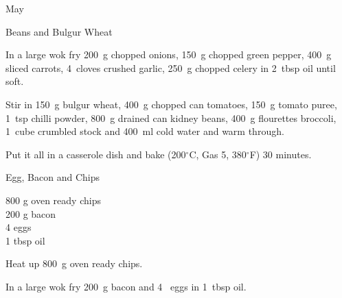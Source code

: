 \begin{menu}{May}
\begin{recipe}{2}{Beans and Bulgur Wheat}
    \begin{instructions}
    \item 
        In a large wok fry
        200~g chopped onions,
        150~g chopped green pepper,
        400~g sliced carrots,
        4~cloves crushed garlic,
        250~g chopped celery
        in
        2~tbsp  oil
        until soft.
      \item 
        Stir in
        150~g  bulgur wheat,
        400~g chopped can tomatoes,
        150~g  tomato puree,
        1~tsp  chilli powder,
        800~g drained can kidney beans,
        400~g flourettes broccoli,
        1~cube crumbled stock
        and
        400~ml  cold water
        and warm through.
      \item 
        Put it all in a casserole dish
        and bake (200$^{\circ}$C, Gas 5, 380$^{\circ}$F) 30 minutes.
      
    \end{instructions}
    \end{recipe}%
  
    \begin{recipe}{1}{Egg, Bacon and Chips}%
		\begin{ingredients}
		800 g oven ready chips  \\
	200 g bacon  \\
	4  eggs  \\
	1 tbsp oil  \\
	
		\end{ingredients}
	
	
    \begin{instructions}
    \item 
        Heat up
        800~g  oven ready chips.
      \item 
        In a large wok fry
        200~g  bacon
        and
        4~  eggs
        in
        1~tbsp  oil.
      
    \end{instructions}
    \end{recipe}%
  
    \clearpage
    \end{menu}
	
